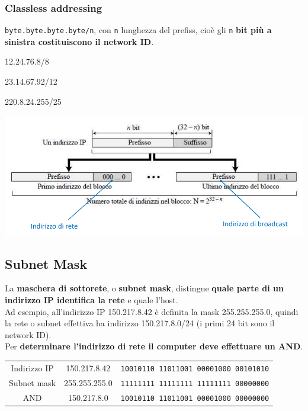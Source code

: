 \documentclass[10pt]{article}
\begin{document}
\subsubsection{Classless addressing}
\texttt{byte.byte.byte.byte/n}, con \texttt{n} lunghezza del prefiss, cioè gli \texttt{n} \textbf{bit più a sinistra costituiscono il network ID}.
\begin{list}{}{}
\item 12.24.76.8/8
\item 23.14.67.92/12
\item 220.8.24.255/25
\end{list}
\begin{center}
\includegraphics[scale=0.6]{ipclassless.png}
\end{center}
\pagebreak
\subsection{Subnet Mask}
La \textbf{maschera di sottorete}, o \textbf{subnet mask}, distingue \textbf{quale parte di un indirizzo IP identifica la rete} e quale l'host.\\
Ad esempio, all'indirizzo IP 150.217.8.42 è definita la mask 255.255.255.0, quindi la rete o subnet effettiva ha indirizzo 150.217.8.0/24 (i primi 24 bit sono il network ID).\\
Per \textbf{determinare l'indirizzo di rete il computer deve effettuare un AND}.
\begin{center}
\begin{tabular}{ c c c }
 Indirizzo IP & 150.217.8.42 & \texttt{10010110  11011001  00001000  00101010} \\ 
 Subnet mask & 255.255.255.0 & \texttt{11111111  11111111  11111111  00000000} \\  
 AND & 150.217.8.0 & \texttt{10010110  11011001  00001000  00000000}
\end{tabular}
\end{center}
\end{document}
